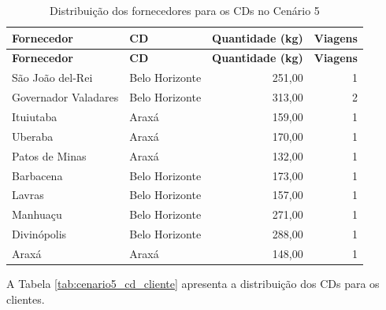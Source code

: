 \documentclass[a4paper,11pt]{article}
\begin{document}
{\footnotesize
\begin{longtable}{p{4.2cm}p{3.3cm}rr}
\caption{Distribuição dos fornecedores para os CDs no Cenário 5}\label{tab:cenario5_fornecedor_cd}\\
\hline
\textbf{Fornecedor} & \textbf{CD} & \textbf{Quantidade (kg)} & \textbf{Viagens} \\ \hline
\endfirsthead
\hline
\textbf{Fornecedor} & \textbf{CD} & \textbf{Quantidade (kg)} & \textbf{Viagens} \\ \hline
\endhead
São João del-Rei & Belo Horizonte & 251,00 & 1 \\
Governador Valadares & Belo Horizonte & 313,00 & 2 \\
Ituiutaba & Araxá & 159,00 & 1 \\
Uberaba & Araxá & 170,00 & 1 \\
Patos de Minas & Araxá & 132,00 & 1 \\
Barbacena & Belo Horizonte & 173,00 & 1 \\
Lavras & Belo Horizonte & 157,00 & 1 \\
Manhuaçu & Belo Horizonte & 271,00 & 1 \\
Divinópolis & Belo Horizonte & 288,00 & 1 \\
Araxá & Araxá & 148,00 & 1 \\ \hline
\end{longtable}
}

A Tabela \ref{tab:cenario5_cd_cliente} apresenta a distribuição dos CDs para os clientes.
\end{document}
